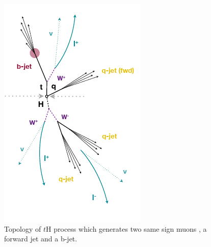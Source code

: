 	\begin{figure}[!htbp]
		\centering
		\includegraphics[scale=0.9]{Chapter1/jet.png}
		\caption{Topology of $t$H process which generates two same sign muons , a forward jet and a b-jet.} 
		\label{jet}
	\end{figure}


